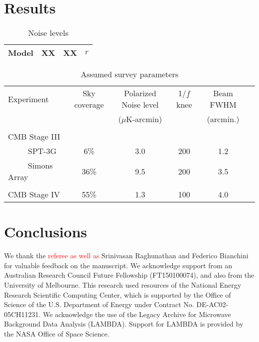\documentclass[apj]{emulateapj}
\newcommand{\changed}[1]{\textcolor{Red}{#1}}
\begin{document}
\section{Results}
\label{sec:results}

\begin{table}[tbh]
\begin{center}
\caption{\label{tab:noise} Noise levels}
\small
\begin{tabular}{l | c c c }
Model   & XX&XX&$r$\\
\hline

\end{tabular}
 \normalsize
\end{center}
\end{table}

\begin{table*}[tbh]
\begin{center}
\caption{\label{tab:experiments} Assumed survey parameters}
\small
\begin{tabular}{l || c c c c c }
Experiment & Sky coverage & Polarized Noise level  & 1/$f$ knee & Beam FWHM \\
& &($\mu$K-arcmin)&&(arcmin.)\\
\hline
\tiny \\ \small
CMB Stage III & & & & \\
~~~~~SPT-3G & 6\% & 3.0 & 200 & 1.2 \\
~~~~~Simons Array & 36\% & 9.5 & 200 & 3.5 \\ 
\tiny \\ \small
CMB Stage IV & 55\% & 1.3 & 100 & 4.0 \\
\end{tabular}
 \normalsize
\end{center}
\end{table*}

\section{Conclusions}
\label{sec:conclusions}
\acknowledgments

We thank the \changed{referee as well as} Srinivasan Raghunathan and Federico Bianchini for valuable feedback on the manuscript. 
We acknowledge support from an Australian Research Council Future Fellowship (FT150100074), and also from the University of Melbourne. 
This research used resources of the National Energy Research Scientific Computing Center, which is supported by the Office of Science of the U.S. Department of Energy under Contract No. DE-AC02-05CH11231. 
We acknowledge the use of the Legacy Archive for Microwave Background Data Analysis (LAMBDA). Support for LAMBDA is provided by the NASA Office of Space Science.



\end{document}
